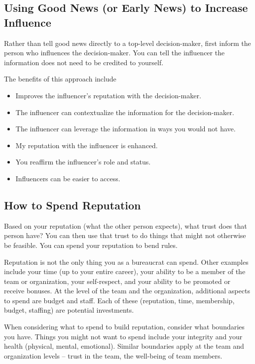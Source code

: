 \subsection*{Using Good News (or Early News) to Increase Influence}

Rather than tell good news directly to a top-level decision-maker, first inform the person who influences the decision-maker.
You can tell the influencer the information does not need to be credited to yourself.

The benefits of this approach include
\begin{itemize}
    \item Improves the influencer's reputation with the decision-maker.
    \item The influencer can contextualize the information for the decision-maker.
    \item The influencer can leverage the information in ways you would not have.
    \item My reputation with the influencer is enhanced.
    \item You reaffirm the influencer's role and status.
    \item Influencers can be easier to access.
\end{itemize}

\subsection*{How to Spend Reputation}

Based on your reputation (what the other person expects), what trust does that person have?  You can then use that trust to do things that might not otherwise be feasible. You can spend your reputation to bend  rules. 

Reputation is not the only thing you as a bureaucrat can spend. Other examples include your time (up to your entire career), your ability to be a member of the team or organization, your self-respect, and your ability to be promoted or receive bonuses. At the level of the team and the organization, additional aspects to spend are  budget and  staff. Each of these (reputation, time, membership, budget, staffing) are potential investments. 

When considering what to spend to build reputation, consider what boundaries you have. 
Things you might not want to spend include your integrity and your health (physical, mental, emotional). Similar boundaries apply at the team and organization levels -- trust in the team, the well-being of team members. 



